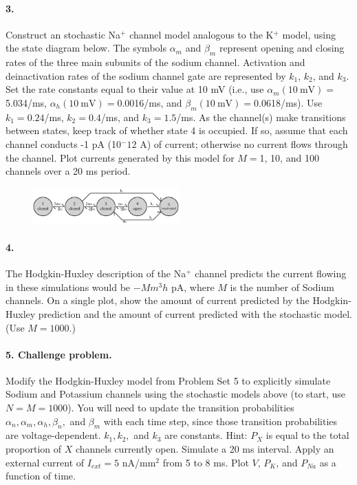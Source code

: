 \documentclass[11pt]{article}
\begin{document}
\paragraph{3.}  Construct an stochastic Na$^+$ channel model analogous
to the K$^+$ model, using the state diagram below.  The symbols $\alpha_m$ and $\beta_m$ represent
opening and closing rates of the three main subunits of the sodium
channel.  Activation and deinactivation rates of the sodium channel
gate are represented by $k_1$, $k_2$, and $k_3$.  Set the rate
constants equal to their value at 10 mV (i.e., use $\alpha_m(10
~\mathrm{mV}) = $5.034/ms, $\alpha_h(10~\mathrm{mV}) = $0.0016/ms, and $\beta_m(10~\mathrm{mV}) = $0.0618/ms).  Use
$k_1 = 0.24$/ms, $k_2 = 0.4$/ms, and $k_3 = 1.5$/ms.  As the channel(s) make transitions between states, keep track of whether state 4 is occupied.  If so, assume that each channel conducts -1 pA (10$^-{12}$ A) of current; otherwise no current flows through the channel.  Plot currents generated by this model for $M = $1, 10, and 100 channels over a 20 ms period.

\begin{figure}[h]
\begin{center}
\includegraphics[width=0.5\textwidth]{hodgkin_huxley_advanced/Na_state_diagram}
\end{center}
\end{figure}

\paragraph{4.}  The Hodgkin-Huxley description of the Na$^+$ channel
predicts the current flowing in these simulations would be $-Mm^3h$ pA,
where $M$ is the number of Sodium channels.  On a single plot, show the amount of current predicted by the Hodgkin-Huxley prediction and the amount of current predicted with the stochastic model.  (Use $M = 1000$.)

\paragraph{5.  Challenge problem.}  Modify the Hodgkin-Huxley model from Problem Set 5 to explicitly simulate Sodium and Potassium channels using the stochastic models above (to start, use $N = M = 1000$).  You will need to update the transition probabilities $\alpha_n, \alpha_m, \alpha_h, \beta_n,$ and $\beta_m$ with each time step, since those transition probabilities are voltage-dependent.  $k_1, k_2,$ and $k_3$ are constants.  Hint: $P_X$ is equal to the total proportion of $X$ channels  currently open.  Simulate a 20 ms interval.  Apply an external current of $I_{ext} = 5$ nA/mm$^2$ from 5 to 8 ms.  Plot $V$, $P_K$, and $P_{Na}$ as a function of time.  
\end{document}
